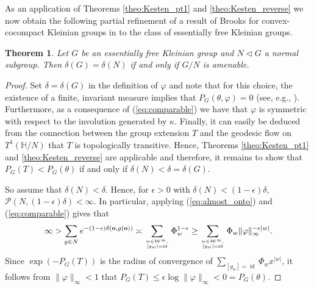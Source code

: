 \documentclass[10pt]{article}
\newtheorem{theorem}{Theorem}[section]
\theoremstyle{mystyle}
\renewcommand{\H}{\mathbb{H}}
\newcommand{\cW}{\mathcal{W}}
\newcommand{\cP}{\mathcal{P}}
\newcommand{\te}{{\theta}}
\newcommand{\1}{\mathbf{1}}
\DeclareMathOperator{\id}{id}
\begin{document}
As an application of Theorems \ref{theo:Kesten_pt1} and \ref{theo:Kesten_reverse} we now obtain the following partial refinement of a result of Brooks for convex-cocompact Kleinian groups in \cite{Brooks:1985} to the class of essentially free Kleinian groups.


\begin{theorem} \label{theo:brooks}
Let $G$ be an essentially free Kleinian group and $N \lhd G$ a normal subgroup. Then $\delta(G)= \delta(N)$ if and only if $G/N$ is amenable.  
\end{theorem}

\begin{proof} Set $\delta= \delta(G)$ in the definition of $\varphi$ and note that for this choice, the existence of a finite, invariant measure implies that $P_G(\te,\varphi)=0$ (see, e.g., \cite{StadlbauerStratmann:2005}). Furthermore, as a consequence of (\ref{eq:comparable}) we have that $\varphi$ is symmetric with respect to the involution generated by $\kappa$. Finally, it can easily be deduced from the connection between the group extension $T$ and the geodesic flow on $T^1(\H/N)$ that $T$ is topologically transitive. Hence, Theorems \ref{theo:Kesten_pt1} and \ref{theo:Kesten_reverse} are applicable and therefore, it remains to show that $P_G(T)< P_G(\te)$ if and only if $\delta(N)<\delta=\delta(G)$. 

So assume that $\delta(N)<\delta$. Hence, for $\epsilon>0$ with  $\delta(N) < (1-\epsilon)\delta$, $\cP(N,(1-\epsilon)\delta)< \infty$. In particular, applying (\ref{eq:almost_onto}) and (\ref{eq:comparable}) gives that
\begin{align*}
\infty > \sum_{g \in N} e^{- (1-\epsilon)\delta(\mathbf{o},g(\mathbf{o}))} \asymp 
\sum_{\genfrac{}{}{0pt}{}{w \in \cW^\infty,}{ [g_w]=\id}} \Phi_w^{1-\epsilon} 
\geq  \sum_{\genfrac{}{}{0pt}{}{w \in \cW^\infty,}{ [g_w]=\id}} 
\Phi_w \|\varphi\|_\infty^{-\epsilon |w|}.
\end{align*}
Since  $\exp(-P_G(T))$ is the radius of convergence of $\sum_{[g_w]=\id} \Phi_w x^{|w|}$, it follows from $\|\varphi\|_\infty < 1$ that $P_G(T) \leq \epsilon \log \|\varphi\|_\infty < 0 = P_G(\te)$.


\end{proof}
\end{document}
